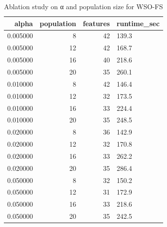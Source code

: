 \begin{table}
\caption{Ablation study on α and population size for WSO-FS}
\label{tab:ablation}
\begin{tabular}{rrrl}
\toprule
alpha & population & features & runtime_sec \\
\midrule
0.005000 & 8 & 42 & 139.3 \\
0.005000 & 12 & 42 & 168.7 \\
0.005000 & 16 & 40 & 218.6 \\
0.005000 & 20 & 35 & 260.1 \\
0.010000 & 8 & 42 & 146.4 \\
0.010000 & 12 & 32 & 173.5 \\
0.010000 & 16 & 33 & 224.4 \\
0.010000 & 20 & 35 & 248.5 \\
0.020000 & 8 & 36 & 142.9 \\
0.020000 & 12 & 32 & 170.8 \\
0.020000 & 16 & 33 & 262.2 \\
0.020000 & 20 & 35 & 286.4 \\
0.050000 & 8 & 32 & 150.2 \\
0.050000 & 12 & 31 & 172.9 \\
0.050000 & 16 & 33 & 218.6 \\
0.050000 & 20 & 35 & 242.5 \\
\bottomrule
\end{tabular}
\end{table}

